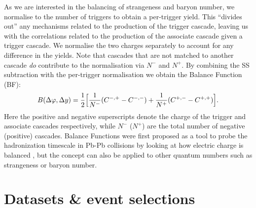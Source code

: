 As we are interested in the balancing of strangeness and baryon number, we normalise to the number of triggers to obtain a per-trigger yield. This ``divides out'' any mechanisms related to the production of the trigger cascade, leaving us with the correlations related to the production of the associate cascade given a trigger cascade.  We normalise the two charges separately to account for any difference in the yields. Note that cascades that are not matched to another cascade \textit{do} contribute to the normalisation via $N^-$ and $N^+$. By combining the SS subtraction with the per-trigger normalisation we obtain the Balance Function (BF):
\begin{align}
  B(\Delta\varphi, \Delta y) = \frac{1}{2} \Big[ \frac{1}{N^-}(C^{-,+} - C^{-,-}) + \frac{1}{N^+}(C^{+,-} - C^{+,+}) \Big]. \label{eq:BF}
\end{align}
Here the positive and negative superscripts denote the charge of the trigger and associate cascades respectively, while $N^-$ ($N^+$) are the total number of negative (positive) cascades. Balance Functions were first proposed as a tool to probe the hadronization timescale in Pb-Pb collisions by looking at how electric charge is balanced \cite{BalanceFunctions}, but the concept can also be applied to other quantum numbers such as strangeness or baryon number. 

\section{Datasets \& event selections}
  \label{sec:datasets}

